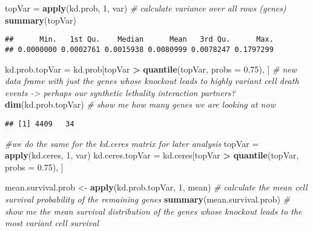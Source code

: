 \documentclass[]{article}
\newenvironment{Shaded}{\begin{snugshade}}{\end{snugshade}}
\newcommand{\CommentTok}[1]{\textcolor[rgb]{0.56,0.35,0.01}{\textit{#1}}}
\newcommand{\DataTypeTok}[1]{\textcolor[rgb]{0.13,0.29,0.53}{#1}}
\newcommand{\DecValTok}[1]{\textcolor[rgb]{0.00,0.00,0.81}{#1}}
\newcommand{\FloatTok}[1]{\textcolor[rgb]{0.00,0.00,0.81}{#1}}
\newcommand{\KeywordTok}[1]{\textcolor[rgb]{0.13,0.29,0.53}{\textbf{#1}}}
\newcommand{\NormalTok}[1]{#1}
\newcommand{\OperatorTok}[1]{\textcolor[rgb]{0.81,0.36,0.00}{\textbf{#1}}}
\newcommand{\StringTok}[1]{\textcolor[rgb]{0.31,0.60,0.02}{#1}}
\begin{document}
\begin{Shaded}
\begin{Highlighting}[]
\NormalTok{topVar =}\StringTok{ }\KeywordTok{apply}\NormalTok{(kd.prob, }\DecValTok{1}\NormalTok{, var) }\CommentTok{# calculate variance over all rows (genes)}
\KeywordTok{summary}\NormalTok{(topVar)}
\end{Highlighting}
\end{Shaded}

\begin{verbatim}
##      Min.   1st Qu.    Median      Mean   3rd Qu.      Max. 
## 0.0000000 0.0002761 0.0015938 0.0080999 0.0078247 0.1797299
\end{verbatim}

\begin{Shaded}
\begin{Highlighting}[]
\NormalTok{kd.prob.topVar =}\StringTok{ }\NormalTok{kd.prob[topVar }\OperatorTok{>}\StringTok{ }\KeywordTok{quantile}\NormalTok{(topVar, }\DataTypeTok{probs =} \FloatTok{0.75}\NormalTok{), ] }\CommentTok{# new data frame with just the genes whose knockout leads to highly variant cell death events -> perhaps our synthetic lethality interaction partners?}
\KeywordTok{dim}\NormalTok{(kd.prob.topVar) }\CommentTok{# show me how many genes we are looking at now}
\end{Highlighting}
\end{Shaded}

\begin{verbatim}
## [1] 4409   34
\end{verbatim}

\begin{Shaded}
\begin{Highlighting}[]
\CommentTok{#we do the same for the kd.ceres matrix for later analysis}
\NormalTok{topVar =}\StringTok{ }\KeywordTok{apply}\NormalTok{(kd.ceres, }\DecValTok{1}\NormalTok{, var)}
\NormalTok{kd.ceres.topVar =}\StringTok{ }\NormalTok{kd.ceres[topVar }\OperatorTok{>}\StringTok{ }\KeywordTok{quantile}\NormalTok{(topVar, }\DataTypeTok{probs =} \FloatTok{0.75}\NormalTok{), ]}


\NormalTok{mean.survival.prob <-}\StringTok{ }\KeywordTok{apply}\NormalTok{(kd.prob.topVar, }\DecValTok{1}\NormalTok{, mean) }\CommentTok{# calculate the mean cell survival probability of the remaining genes}
\KeywordTok{summary}\NormalTok{(mean.survival.prob) }\CommentTok{# show me the mean survival distribution of the genes whose knockout leads to the most variant cell survival}
\end{Highlighting}
\end{Shaded}
\end{document}
